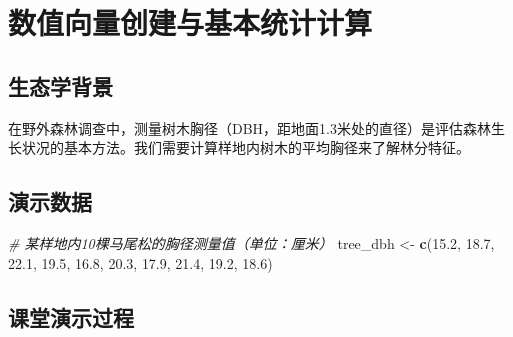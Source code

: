 \documentclass[
]{book}
\newenvironment{Shaded}{\begin{snugshade}}{\end{snugshade}}
\newcommand{\CommentTok}[1]{\textcolor[rgb]{0.56,0.35,0.01}{\textit{#1}}}
\newcommand{\FloatTok}[1]{\textcolor[rgb]{0.00,0.00,0.81}{#1}}
\newcommand{\FunctionTok}[1]{\textcolor[rgb]{0.13,0.29,0.53}{\textbf{#1}}}
\newcommand{\NormalTok}[1]{#1}
\newcommand{\OtherTok}[1]{\textcolor[rgb]{0.56,0.35,0.01}{#1}}
\begin{document}
\hypertarget{ux6570ux503cux5411ux91cfux521bux5efaux4e0eux57faux672cux7edfux8ba1ux8ba1ux7b97}{%
\section{数值向量创建与基本统计计算}\label{ux6570ux503cux5411ux91cfux521bux5efaux4e0eux57faux672cux7edfux8ba1ux8ba1ux7b97}}

\hypertarget{ux751fux6001ux5b66ux80ccux666f}{%
\subsection{生态学背景}\label{ux751fux6001ux5b66ux80ccux666f}}

在野外森林调查中，测量树木胸径（DBH，距地面1.3米处的直径）是评估森林生长状况的基本方法。我们需要计算样地内树木的平均胸径来了解林分特征。

\hypertarget{ux6f14ux793aux6570ux636e}{%
\subsection{演示数据}\label{ux6f14ux793aux6570ux636e}}

\begin{Shaded}
\begin{Highlighting}[]
\CommentTok{\# 某样地内10棵马尾松的胸径测量值（单位：厘米）}
\NormalTok{tree\_dbh }\OtherTok{\textless{}{-}} \FunctionTok{c}\NormalTok{(}\FloatTok{15.2}\NormalTok{, }\FloatTok{18.7}\NormalTok{, }\FloatTok{22.1}\NormalTok{, }\FloatTok{19.5}\NormalTok{, }\FloatTok{16.8}\NormalTok{, }\FloatTok{20.3}\NormalTok{, }\FloatTok{17.9}\NormalTok{, }\FloatTok{21.4}\NormalTok{, }\FloatTok{19.2}\NormalTok{, }\FloatTok{18.6}\NormalTok{)}
\end{Highlighting}
\end{Shaded}

\hypertarget{ux8bfeux5802ux6f14ux793aux8fc7ux7a0b}{%
\subsection{课堂演示过程}\label{ux8bfeux5802ux6f14ux793aux8fc7ux7a0b}}
\end{document}
